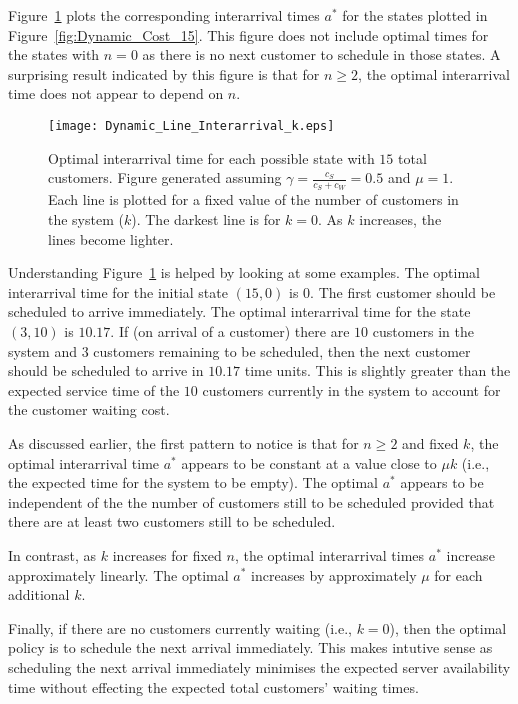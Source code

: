 Figure~\ref{fig:Dynamic_Time_15} plots the corresponding interarrival times $a^{*}$ for the states plotted in Figure~\ref{fig:Dynamic_Cost_15}. This figure does not include optimal times for the states with $n = 0$ as there is no next customer to schedule in those states. A surprising result indicated by this figure is that for $n \geq 2$, the optimal interarrival time does not appear to depend on $n$.
\begin{figure}[htb]
	\centering
	\texttt{[image: Dynamic\_Line\_Interarrival\_k.eps]}
	\caption{Optimal interarrival time for each possible state with $15$ total customers. Figure generated assuming $\gamma = \frac{c_{S}}{c_{S} + c_{W}} = 0.5$ and $\mu = 1$. Each line is plotted for a fixed value of the number of customers in the system ($k$). The darkest line is for $k = 0$. As $k$ increases, the lines become lighter.}
	\label{fig:Dynamic_Time_15}
\end{figure}

Understanding Figure~\ref{fig:Dynamic_Time_15} is helped by looking at some examples. The optimal interarrival time for the initial state $(15, 0)$ is $0$. The first customer should be scheduled to arrive immediately. The optimal interarrival time for the state $(3, 10)$ is $10.17$. If (on arrival of a customer) there are $10$ customers in the system and $3$ customers remaining to be scheduled, then the next customer should be scheduled to arrive in $10.17$ time units. This is slightly greater than the expected service time of the $10$ customers currently in the system to account for the customer waiting cost.

As discussed earlier, the first pattern to notice is that for $n \geq 2$ and fixed $k$, the optimal interarrival time $a^{*}$ appears to be constant at a value close to $\mu k$ (i.e., the expected time for the system to be empty). The optimal $a^{*}$ appears to be independent of the the number of customers still to be scheduled provided that there are at least two customers still to be scheduled.

In contrast, as $k$ increases for fixed $n$, the optimal interarrival times $a^{*}$ increase approximately linearly. The optimal $a^{*}$ increases by approximately $\mu$ for each additional $k$.

Finally, if there are no customers currently waiting (i.e., $k = 0$), then the optimal policy is to schedule the next arrival immediately. This makes intutive sense as scheduling the next arrival immediately minimises the expected server availability time without effecting the expected total customers' waiting times.

































